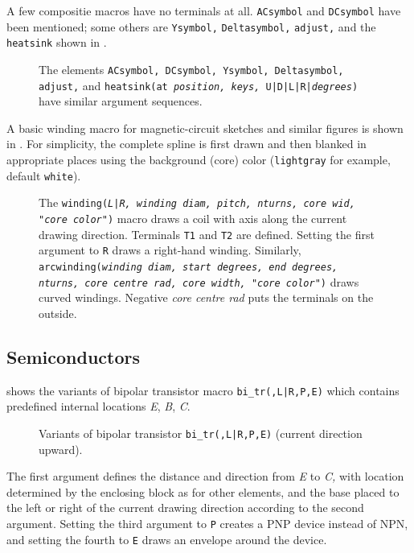 A few compositie macros have no terminals at all. {\tt ACsymbol}
 and {\tt DCsymbol} have been mentioned; some others are {\tt Ysymbol,}
 {\tt Deltasymbol,} {\tt adjust,} and the {\tt heatsink} shown in .
\begin{figure}[H]
   
   \caption{The elements {\tt ACsymbol, DCsymbol, Ysymbol, Deltasymbol,
     adjust,} and
    {\tt heatsink(at {\sl position, keys,}
      U|D|L|R|{\sl degrees})} have similar argument sequences.}
   \label{heatsink}
   \end{figure}

A basic winding macro for magnetic-circuit sketches and similar figures
is shown in .
For simplicity, the complete spline
is first drawn and then blanked in appropriate places using the background
(core) color (\verb!lightgray! for example, default \verb!white!).
\begin{figure}[H]
   
   \caption{The {\tt winding({\sl L|R, winding diam, pitch, nturns, core wid,
      {\tt"}core color{\tt"}})}
     macro draws a coil with axis along the current drawing direction.
     Terminals {\tt T1} and {\tt T2} are defined.
     Setting the first argument to {\tt R} draws a right-hand winding.
     Similarly, {\tt arcwinding({\sl winding diam, start degrees,
      end degrees, nturns, core centre rad, core width,
      {\tt"}core color{\tt"}})} 
     draws curved windings.  Negative {\sl core centre rad} puts the terminals
     on the outside.}
   \label{Windings}
   \end{figure}

\subsection{Semiconductors\label{Semiconductors:}}%
 shows the variants of bipolar transistor macro
{\tt bi\_tr(\linespec,L|R,P,E)}
which contains predefined internal locations {\sl E},
{\sl B}, {\sl C}.
\begin{figure}[H]
   \vspace*{-1ex}
   
   \caption{Variants of bipolar transistor {\tt bi\_tr(\linespec,L|R,P,E)}
    (current direction upward).}
   \label{Bip}
   \end{figure}
The first argument defines the distance and direction from {\sl E}
to {\sl C,} with location determined by the enclosing
block as for other elements, and the base placed
to the left or right of the
current drawing direction according to the second argument.  Setting the third
argument to {\tt P} creates a PNP device instead of NPN, and setting the
fourth to {\tt E} draws an envelope around the device.

